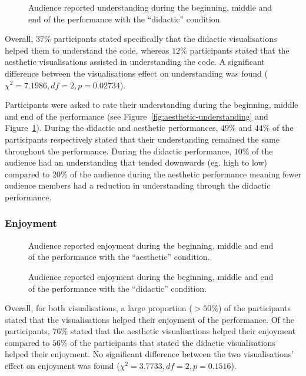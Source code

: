 \documentclass{sig-alternate}
\begin{document}
\begin{figure}
\centering
{}
\caption{Audience reported understanding during the beginning, middle and end of the performance with the ``didactic'' condition.}
\label{fig:didactic-understanding}
\end{figure}

Overall, $37\%$ participants stated specifically that the didactic visualisations helped them to understand the code, whereas $12\%$ participants stated that the aesthetic visualisations assisted in understanding the code. A significant difference between the visualisations effect on understanding was found ($\chi^2=7.1986,df=2,p=0.02734$).

Participants were asked to rate their understanding during the beginning, middle and end of the performance (see Figure~\ref{fig:aesthetic-understanding} and Figure~\ref{fig:didactic-understanding}). During the didactic and aesthetic performances, $49\%$ and $44\%$ of the participants respectively stated that their understanding remained the same throughout the performance. During the didactic performance, $10\%$ of the audience had an understanding that tended downwards (eg. high to low) compared to $20\%$ of the audience during the aesthetic performance meaning fewer audience members had a reduction in understanding through the didactic performance.

\subsubsection{Enjoyment}

\begin{figure}
\centering
{}
\caption{Audience reported enjoyment during the beginning, middle and end of the performance with the ``aesthetic'' condition.}
\label{fig:aesthetic-enjoyment}
\end{figure}

\begin{figure}
\centering
{}
\caption{Audience reported enjoyment during the beginning, middle and end of the performance with the ``didactic'' condition.}
\label{fig:didactic-enjoyment}
\end{figure}

Overall, for both visualisations, a large proportion ($> 50\%$) of the participants stated that the visualisations helped their enjoyment of the performance. Of the participants, $76\%$ stated that the aesthetic visualisations helped their enjoyment compared to $56\%$ of the participants that stated the didactic visualisations helped their enjoyment. No significant difference between the two visualisations' effect on enjoyment was found ($\chi^2=3.7733,df=2,p=0.1516$).
\end{document}
